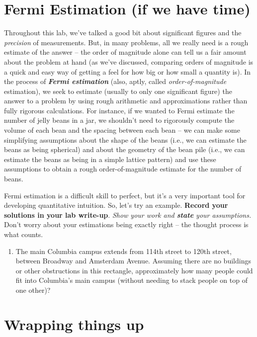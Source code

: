 \documentclass[11pt]{article}
\begin{document}
\section{Fermi Estimation (if we have time)}
Throughout this lab, we've talked a good bit about significant figures and the \emph{precision} of measurements. But, in many problems, all we really need is a rough estimate of the answer -- the order of magnitude alone can tell us a fair amount about the problem at hand (as we've discussed, comparing orders of magnitude is a quick and easy way of getting a feel for how big or how small a quantity is). In the process of \textbf{\emph{Fermi estimation}} (also, aptly, called \emph{order-of-magnitude} estimation), we seek to estimate (usually to only one significant figure) the answer to a problem by using rough arithmetic and approximations rather than fully rigorous calculations. For instance, if we wanted to Fermi estimate the number of jelly beans in a jar, we shouldn't need to rigorously compute the volume of each bean and the spacing between each bean -- we can make some simplifying assumptions about the shape of the beans (i.e., we can estimate the beans as being spherical) and about the geometry of the bean pile (i.e., we can estimate the beans as being in a simple lattice pattern) and use these assumptions to obtain a rough order-of-magnitude estimate for the number of beans.

\bigskip 

Fermi estimation is a difficult skill to perfect, but it's a very important tool for developing quantitative intuition. So, let's try an example. \textbf{Record your solutions in your lab write-up}. \textit{Show your work and \textbf{state} your assumptions.} Don't worry about your estimations being exactly right -- the thought process is what counts.
\begin{enumerate} 
    
    \item The main Columbia campus extends from 114th street to 120th street, between Broadway and Amsterdam Avenue. Assuming there are no buildings or other obstructions in this rectangle, approximately how many people could fit into Columbia's main campus (without needing to stack people on top of one other)? 
\end{enumerate}

\section{Wrapping things up}
\end{document}

